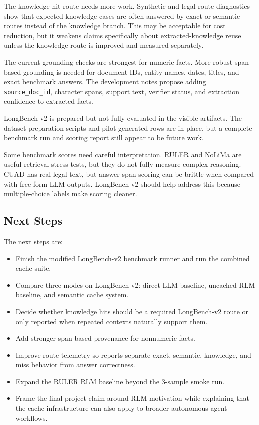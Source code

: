 \documentclass[10pt,a4paper]{article}
\begin{document}
The knowledge-hit route needs more work. Synthetic and legal route diagnostics show that expected knowledge cases are often answered by exact or semantic routes instead of the knowledge branch. This may be acceptable for cost reduction, but it weakens claims specifically about extracted-knowledge reuse unless the knowledge route is improved and measured separately.

The current grounding checks are strongest for numeric facts. More robust span-based grounding is needed for document IDs, entity names, dates, titles, and exact benchmark answers. The development notes propose adding \texttt{source\_doc\_id}, character spans, support text, verifier status, and extraction confidence to extracted facts.

LongBench-v2 is prepared but not fully evaluated in the visible artifacts. The dataset preparation scripts and pilot generated rows are in place, but a complete benchmark run and scoring report still appear to be future work.

Some benchmark scores need careful interpretation. RULER and NoLiMa are useful retrieval stress tests, but they do not fully measure complex reasoning. CUAD has real legal text, but answer-span scoring can be brittle when compared with free-form LLM outputs. LongBench-v2 should help address this because multiple-choice labels make scoring cleaner.

\subsection{Next Steps}

The next steps are:

\begin{itemize}
\item Finish the modified LongBench-v2 benchmark runner and run the combined cache suite.
\item Compare three modes on LongBench-v2: direct LLM baseline, uncached RLM baseline, and semantic cache system.
\item Decide whether knowledge hits should be a required LongBench-v2 route or only reported when repeated contexts naturally support them.
\item Add stronger span-based provenance for nonnumeric facts.
\item Improve route telemetry so reports separate exact, semantic, knowledge, and miss behavior from answer correctness.
\item Expand the RULER RLM baseline beyond the 3-sample smoke run.
\item Frame the final project claim around RLM motivation while explaining that the cache infrastructure can also apply to broader autonomous-agent workflows.
\end{itemize}
\end{document}
